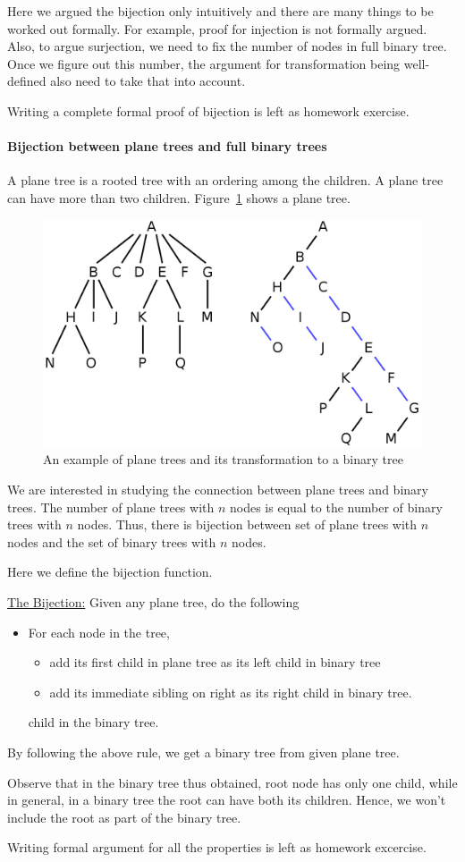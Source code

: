 Here we argued the bijection only intuitively and there are many things to be worked out formally. For example, proof for injection is not formally argued. Also, to argue surjection, we need to fix the number of nodes in full binary tree. Once we figure out this number, the argument for transformation being  well-defined also need to take that into account.

Writing a complete formal proof of bijection is left as homework exercise.

\paragraph{Bijection between plane trees and full binary trees}
A plane tree is a rooted tree with an ordering among the children. A plane tree can have more than two children. Figure~\ref{fig:plane-tree-1} shows a plane tree. 

\begin{figure}[h!]
    \centering
    \includegraphics[width=0.8\linewidth]{plane-tree.png}
    \caption{An example of plane trees and its transformation to a binary tree}
    \label{fig:plane-tree-1}
\end{figure}

We are interested in studying the connection between plane trees and binary trees. The number of plane trees with $n$ nodes is equal to the number of binary trees with $n$ nodes. Thus, there is bijection between set of plane trees with $n$ nodes and the set of  binary trees with $n$ nodes. 

Here we define the bijection function. 

\noindent\underline{The Bijection:} Given any plane tree, do the following
\begin{itemize}
    \item For each node in the tree, 
    \begin{itemize}
        \item add its first child in plane tree as its left child in binary tree
        \item add its immediate sibling on right as its right child in binary tree.
    \end{itemize} child in the binary tree.
\end{itemize}
By following the above rule, we get a binary tree from given plane tree.

Observe that in the binary tree thus obtained, root node has only one child, while in general, in a binary tree the root can have both its children. Hence, we won't include the root as part of the binary tree.

Writing formal argument for all the properties is left as homework excercise.
